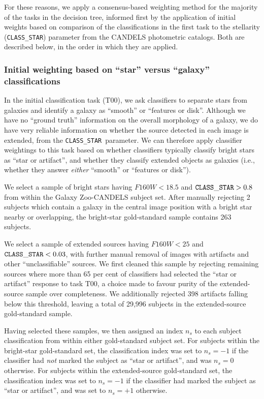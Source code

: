 \documentclass[useAMS,usenatbib]{mn2e}
\def\stellarity   {{\tt CLASS\_STAR}}
\begin{document}
{For these reasons, we apply a consensus-based weighting method for the majority of the tasks in the decision tree, informed first by the application of initial weights based on comparison of the classifications in the first task to the stellarity (\stellarity ) parameter from the CANDELS photometric catalogs. Both are described below, in the order in which they are applied.

\subsubsection{Initial weighting based on ``star'' versus ``galaxy'' classifications}

In the initial classification task (T00), we ask classifiers to separate stars from galaxies and identify a galaxy as ``smooth'' or ``features or disk''. Although we have no ``ground truth'' information on the overall morphology of a galaxy, we do have very reliable information on whether the source detected in each image is extended, from the \stellarity\ parameter. We can therefore apply classifier weightings to this task based on whether classifiers typically classify bright stars as ``star or artifact'', and whether they classify extended objects as galaxies (i.e., whether they answer \emph{either} ``smooth'' or ``features or disk'').

We select a sample of bright stars having $F160W < 18.5$ and $\stellarity  > 0.8$ from within the Galaxy Zoo-CANDELS subject set. After manually rejecting 2 subjects which contain a galaxy in the central image position with a bright star nearby or overlapping, the bright-star gold-standard sample contains 263 subjects.

We select a sample of extended sources having $F160W < 25$ and $\stellarity < 0.03$, with further manual removal of images with artifacts and other ``unclassifiable'' sources. We first cleaned this sample by rejecting remaining sources where more than 65 per cent of classifiers had selected the ``star or artifact'' response to task T00, a choice made to favour purity of the extended-source sample over completeness. We additionally rejected 398 artifacts falling below this threshold, leaving a total of 29,996 subjects in the extended-source gold-standard sample. 

Having selected these samples, we then assigned an index $n_s$ to each subject classification from within either gold-standard subject set. For subjects within the bright-star gold-standard set, the classification index was set to $n_s = -1$ if the classifier had \emph{not} marked the subject as ``star or artifact'', and was $n_s = 0$ otherwise. For subjects within the extended-source gold-standard set, the classification index was set to $n_s = -1$ if the classifier had marked the subject as ``star or artifact'', and was set to $n_s = +1$ otherwise.

}
\end{document}
